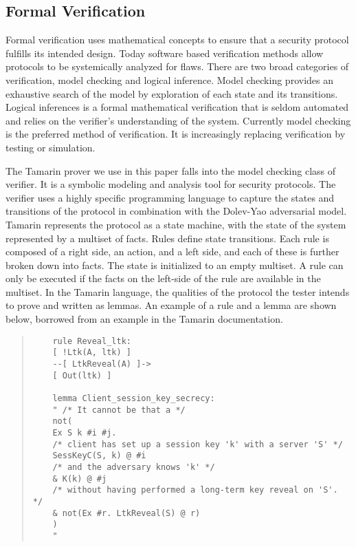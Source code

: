 \documentclass[10pt, pdftex]{article}
\begin{document}
\subsection{Formal Verification}
Formal verification uses mathematical concepts to ensure that a security protocol fulfills its intended design. Today software based verification methods allow protocols to be systemically analyzed for flaws. There are two broad categories of verification, model checking and logical inference.\cite{edsarx.1101.181520110101} Model checking provides an exhaustive search of the model by exploration of each state and its transitions. Logical inferences is a formal mathematical verification that is seldom automated and relies on the verifier's understanding of the system. Currently model checking is the preferred method of verification. It is increasingly replacing verification by testing or simulation. 

The Tamarin prover we use in this paper falls into the model checking class of verifier. It is a symbolic modeling and analysis tool for security protocols. The verifier uses a highly specific programming language to capture the states and transitions of the protocol in combination with the Dolev-Yao adversarial model. Tamarin represents the protocol as a state machine, with the state of the system represented by a multiset of facts. Rules define state transitions. Each rule is composed of a right side, an action, and a left side, and each of these is further broken down into facts. The state is initialized to an empty multiset. A rule can only be executed if the facts on the left-side of the rule are available in the multiset. In the Tamarin language, the qualities of the protocol the tester intends to prove and written as lemmas. An example of a rule and a lemma are shown below, borrowed from an example in the Tamarin documentation.\cite{tamarinTeam}

\begin{quote}
	\begin{verbatim}
	rule Reveal_ltk:
	[ !Ltk(A, ltk) ]
	--[ LtkReveal(A) ]->
	[ Out(ltk) ]
	
	lemma Client_session_key_secrecy:
	" /* It cannot be that a */
	not(
	Ex S k #i #j.
	/* client has set up a session key 'k' with a server 'S' */
	SessKeyC(S, k) @ #i
	/* and the adversary knows 'k' */
	& K(k) @ #j
	/* without having performed a long-term key reveal on 'S'. */
	& not(Ex #r. LtkReveal(S) @ r)
	)
	"
	\end{verbatim}
\end{quote}
\end{document}
